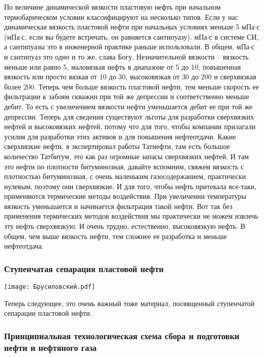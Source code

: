 \documentclass[main.tex]{subfiles}
\begin{document}
По величине динамической вязкости пластовую нефть при начальном термобарическом условии классифицируют на несколько типов.
Если у нас динамическая вязкость пластовой нефти при начальных условиях меньше 5 мПа$\cdot$с (мПа$\cdot$с, если вы будете встречать, он равняется сантипуазу).
мПа$\cdot$с в системе СИ, а сантипуазы это в инженерной практике раньше использовали.
В общем, мПа$\cdot$с и сантипуаз это одно и то же, слава Богу.
Незначительной вязкости -- вязкость меньше или равно 5, маловязкая нефть в диапазоне от 5 до 10, повышенная вязкость или просто вязкая от 10 до
30, высоковязкая от 30 до 200 и сверхвязкая более 200.
Теперь чем больше вязкость пластовой нефти, тем меньше скорость ее фильтрации к забоям скважин при той же депрессии и соответственно меньше дебит.
То есть с увеличением вязкости нефти уменьшается дебит ее при той же депрессии.
Теперь для сведения существуют льготы для разработки сверхвязких нефтей и высоковязких нефтей, потому что для того, чтобы компании прилагали усилия для разработки этих активов и для повышения нефтеотдачи.
Какие сверхвязкие нефти, я экспертировал работы Татнефти, там есть большое количество Татбитум, это как раз огромные запасы сверхвязких нефтей.
И там это нефти по плотности битуминозная, давайте вспомним, свяжем вязкость с плотностью битуминозная, с очень маленьким газосодержанием, практически нулевым, поэтому они сверхвязкие.
И для того, чтобы нефть притекала все-таки, применяются термические методы воздействия.
При увеличении температуры вязкость уменьшается и начинается фильтрация такой нефти.
Вот так без применения термических методов воздействия мы практически не можем извлечь эту нефть сверхвязкую.
И очень трудно, естественно, высоковязкую нефть.
В общем, чем выше вязкость нефти, тем сложнее ее разработка и меньше нефтеотдача.

\subsubsection{Ступенчатая сепарация пластовой нефти}

\begin{center}
\texttt{[image: Брусиловский.pdf]}
\end{center}

Теперь следующее, это очень важный тоже материал, посвященный ступенчатой сепарации пластовой нефти.

\subsubsection{Принципиальная технологическая схема сбора и подготовки нефти и нефтяного газа}
\end{document}
